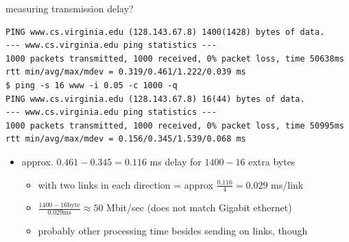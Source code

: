 \begin{frame}[fragile]{measuring transmission delay?}
\begin{Verbatim}[fontsize=\fontsize{10}{11}]
PING www.cs.virginia.edu (128.143.67.8) 1400(1428) bytes of data.
--- www.cs.virginia.edu ping statistics ---
1000 packets transmitted, 1000 received, 0% packet loss, time 50638ms
rtt min/avg/max/mdev = 0.319/0.461/1.222/0.039 ms
$ ping -s 16 www -i 0.05 -c 1000 -q
PING www.cs.virginia.edu (128.143.67.8) 16(44) bytes of data.
--- www.cs.virginia.edu ping statistics ---
1000 packets transmitted, 1000 received, 0% packet loss, time 50995ms
rtt min/avg/max/mdev = 0.156/0.345/1.539/0.068 ms
\end{Verbatim}
\begin{itemize}
\item approx. $0.461 - 0.345 = 0.116$ ms delay for $1400-16$ extra bytes
    \begin{itemize}
    \item with two links in each direction = approx $\frac{0.116}{4}=0.029$ ms/link
    \item $\frac{1400-16 \text{byte}}{0.029 \text{ms}} \approx 50$ Mbit/sec (does not match Gigabit ethernet)
    \item probably other processing time besides sending on links, though
    \end{itemize}
\end{itemize}
\end{frame}
